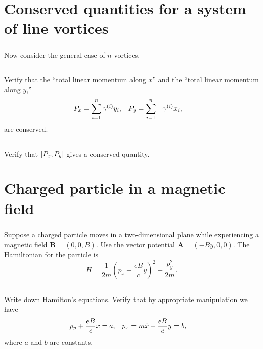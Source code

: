 \documentclass[11pt]{article}
\renewcommand{\vec}[1]{\mathbf{#1}}
\newcommand{\vfix}{\vspace{-\baselineskip}}
\newcommand{\beq}{\begin{equation*}}
\newcommand{\eeq}{\end{equation*}}
\newenvironment{statement}[1]
{
	\section{#1}
	\color{darkgray}
	\ignorespaces
}
{
}
\newenvironment{problem}
{
	\subsection{}
	\color{darkgray}
    \ignorespaces
}
{

}
\begin{document}
\begin{statement}{Conserved quantities for a system of line vortices} \label{vort2}
\subparagraph{}
	Now consider the general case of $n$ vortices.
\end{statement}

\begin{problem}
	Verify that the ``total linear momentum along $x$'' and the ``total linear momentum along $y$,''
	\begin{align*}
		P_x &= \sum_{i = 1}^n \gamma^{(i)} y_i, &
		P_y &= \sum_{i = 1}^n -\gamma^{(i)} x_i,
	\end{align*}
	are conserved.
\end{problem}

\begin{problem}
	Verify that $[P_x, P_y]$ gives a conserved quantity.
\end{problem}


\newcommand{\vB}{\vec{B}}
\newcommand{\vA}{\vec{A}}
\newcommand{\px}{p_x}
\newcommand{\py}{p_y}
\newcommand{\pdx}{\dot{p}_x}
\newcommand{\pdy}{\dot{p}_y}

\begin{statement}{Charged particle in a magnetic field}
\subparagraph{}
	Suppose a charged particle moves in a two-dimensional plane while experiencing a magnetic field $\vB = (0, 0, B)$.  Use the vector potential $\vA = (-By, 0, 0)$.  The Hamiltonian for the particle is
	\beq
		H = \frac{1}{2m} \left( \px + \frac{e B}{c} y \right)^2 + \frac{\py^2}{2m}.
	\eeq
\vfix
\end{statement}

\begin{problem}
	Write down Hamilton's equations.  Verify that by appropriate manipulation we have
	\begin{align*}
		\py + \frac{e B}{c} x &= a, &
		\px &= m \xd - \frac{e B}{c} y = b,
	\end{align*}
	where $a$ and $b$ are constants.
\end{problem}
\end{document}
